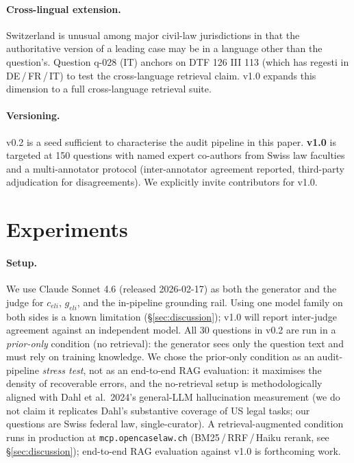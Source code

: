 \documentclass[11pt,a4paper]{article}
\begin{document}
\paragraph{Cross-lingual extension.}
Switzerland is unusual among major civil-law
jurisdictions in that the authoritative version of a
leading case may be in a language other than the
question's.  Question q-028 (IT) anchors on DTF 126
III 113 (which has regesti in DE\,/\,FR\,/\,IT) to
test the cross-language retrieval claim.  v1.0
expands this dimension to a full cross-language
retrieval suite.

\paragraph{Versioning.}
v0.2 is a seed sufficient to characterise the audit
pipeline in this paper.  \textbf{v1.0} is targeted at
150 questions with named expert co-authors from
Swiss law faculties and a multi-annotator protocol
(inter-annotator agreement reported, third-party
adjudication for disagreements).  We explicitly
invite contributors for v1.0.


\section{Experiments}
\label{sec:experiments}

\paragraph{Setup.}
We use Claude Sonnet 4.6 (released 2026-02-17) as
both the generator and the judge for $c_{eli}$,
$g_{eli}$, and the in-pipeline grounding rail.  Using
one model family on both sides is a known limitation
(\S\ref{sec:discussion}); v1.0 will report inter-judge
agreement against an independent model.  All 30
questions in v0.2 are run in a \emph{prior-only}
condition (no retrieval): the generator sees only
the question text and must rely on training knowledge.
We chose the prior-only condition as an audit-pipeline
\emph{stress test}, not as an end-to-end RAG
evaluation: it maximises the density of recoverable
errors, and the
no-retrieval setup is methodologically aligned with
Dahl et al.\ 2024's general-LLM hallucination
measurement (we do not claim it replicates Dahl's
substantive coverage of US legal tasks; our
questions are Swiss federal law, single-curator).  A retrieval-augmented
condition runs in production at
\texttt{mcp.opencaselaw.ch} (BM25\,/\,RRF\,/\,Haiku
rerank, see \S\ref{sec:discussion}); end-to-end RAG
evaluation against v1.0 is forthcoming work.
\end{document}
